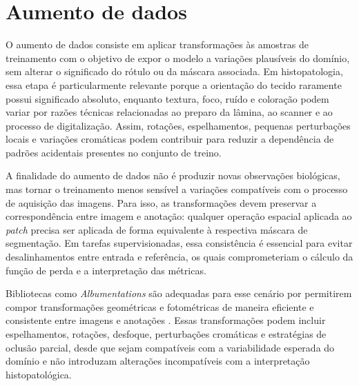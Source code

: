 \section{Aumento de dados}\label{sec:aumento_dados} 

O aumento de dados consiste em aplicar transformações às amostras de treinamento com o objetivo de expor o modelo a variações plausíveis do domínio, sem alterar o significado do rótulo ou da máscara associada. Em histopatologia, essa etapa é particularmente relevante porque a orientação do tecido raramente possui significado absoluto, enquanto textura, foco, ruído e coloração podem variar por razões técnicas relacionadas ao preparo da lâmina, ao scanner e ao processo de digitalização. Assim, rotações, espelhamentos, pequenas perturbações locais e variações cromáticas podem contribuir para reduzir a dependência de padrões acidentais presentes no conjunto de treino. 

A finalidade do aumento de dados não é produzir novas observações biológicas, mas tornar o treinamento menos sensível a variações compatíveis com o processo de aquisição das imagens. Para isso, as transformações devem preservar a correspondência entre imagem e anotação: qualquer operação espacial aplicada ao \textit{patch} precisa ser aplicada de forma equivalente à respectiva máscara de segmentação. Em tarefas supervisionadas, essa consistência é essencial para evitar desalinhamentos entre entrada e referência, os quais comprometeriam o cálculo da função de perda e a interpretação das métricas. 

Bibliotecas como \textit{Albumentations} são adequadas para esse cenário por permitirem compor transformações geométricas e fotométricas de maneira eficiente e consistente entre imagens e anotações \cite{buslaev2020albumentations,dossantos2023augmentation,shorten2019survey}. Essas transformações podem incluir espelhamentos, rotações, desfoque, perturbações cromáticas e estratégias de oclusão parcial, desde que sejam compatíveis com a variabilidade esperada do domínio e não introduzam alterações incompatíveis com a interpretação histopatológica. 


